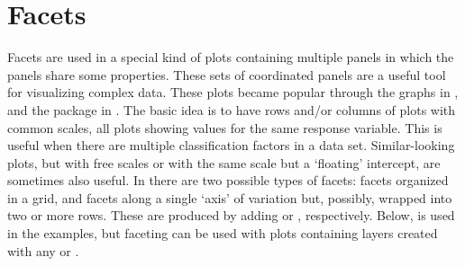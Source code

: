 \documentclass[krantz2]{krantz}\usepackage{knitr}
\begin{document}
%
%
%
%



\section{Facets}\label{sec:plot:facets}
Facets are used in a special kind of plots containing multiple panels in which the panels share some properties. These sets of coordinated panels are a useful tool for visualizing complex data. These plots became popular through the  graphs in , and the  package in \Rlang. The basic idea is to have rows and/or columns of plots with common scales, all plots showing values for the same response variable. This is useful when there are multiple classification factors in a data set. Similar-looking plots, but with free scales or with the same scale but a `floating' intercept, are sometimes also useful. In \ggplot there are two possible types of facets: facets organized in a grid, and facets along a single `axis' of variation but, possibly, wrapped into two or more rows. These are produced by adding  or , respectively. Below,  is used in the examples, but faceting can be used with plots containing layers created with any  or .
\end{document}
